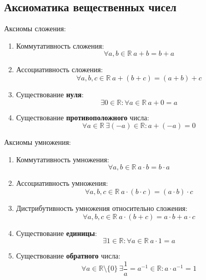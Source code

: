 \subsection{Аксиоматика вещественных чисел}
Аксиомы сложения:
\begin{enumerate}
	\item Коммутативность сложения:
	\begin{equation*}
	\forall a, b \in \mathbb R \ a + b = b + a
	\end{equation*}
	
	\item Ассоциативность сложения:
	\begin{equation*}
	\forall a, b, c \in \mathbb R \ a + (b + c) = (a + b) + c
	\end{equation*}
	
	\item Существование \textbf{нуля}:
	\begin{equation*}
	\exists 0 \in \mathbb R \colon \forall a \in \mathbb R \ a + 0 = a
	\end{equation*}
	
	\item Существование \textbf{противоположного} числа:
	\begin{equation*}
	\forall a \in \mathbb R \ \exists (-a) \in \mathbb R \colon a + (-a) = 0
	\end{equation*}
\end{enumerate}

Аксиомы умножения:
\begin{enumerate}
	\item Коммутативность умножения:
	\begin{equation*}
	\forall a, b \in \mathbb R \ a \cdot b = b \cdot a
	\end{equation*}
	
	\item Ассоциативность умножения:
	\begin{equation*}
	\forall a, b, c \in \mathbb R \ a \cdot (b \cdot c) = (a \cdot b) \cdot c
	\end{equation*}
	
	\item Дистрибутивность умножения относительно сложения:
	\begin{equation*}
	\forall a, b, c \in \mathbb R \ a \cdot (b + c) = a \cdot b + a \cdot c
	\end{equation*}
	
	\item Существование \textbf{единицы}:
	\begin{equation*}
	\exists 1 \in \mathbb R \colon \forall a \in \mathbb R \ a \cdot 1 = a
	\end{equation*}
	
	\item Существование \textbf{обратного} числа:
	\begin{equation*}
	\forall a \in \mathbb R \setminus \{ 0 \} \ \exists \frac1a = a^{-1} \in \mathbb R \colon
	a \cdot a^{-1} = 1
	\end{equation*}
\end{enumerate}


